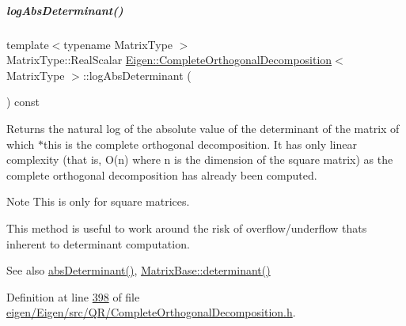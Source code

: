 \mbox{\label{group___q_r___module_ad59d6dc78dab52a0038ac372b4a72c0d}} 
\subparagraph{\texorpdfstring{log\+Abs\+Determinant()}{logAbsDeterminant()}\hspace{0.1cm}{\footnotesize\ttfamily [1/2]}}
{\footnotesize\ttfamily template$<$typename Matrix\+Type $>$ \\
Matrix\+Type\+::\+Real\+Scalar \hyperlink{group___q_r___module_class_eigen_1_1_complete_orthogonal_decomposition}{Eigen\+::\+Complete\+Orthogonal\+Decomposition}$<$ Matrix\+Type $>$\+::log\+Abs\+Determinant (\begin{DoxyParamCaption}{ }\end{DoxyParamCaption}) const}

\begin{DoxyReturn}{Returns}
the natural log of the absolute value of the determinant of the matrix of which $\ast$this is the complete orthogonal decomposition. It has only linear complexity (that is, O(n) where n is the dimension of the square matrix) as the complete orthogonal decomposition has already been computed.
\end{DoxyReturn}
\begin{DoxyNote}{Note}
This is only for square matrices.

This method is useful to work around the risk of overflow/underflow that\textquotesingle{}s inherent to determinant computation.
\end{DoxyNote}
\begin{DoxySeeAlso}{See also}
\hyperlink{group___q_r___module_ac040c34ce3fb2b68d3f57adc0c29d526}{abs\+Determinant()}, \hyperlink{group___core___module_a7ad8f77004bb956b603bb43fd2e3c061}{Matrix\+Base\+::determinant()} 
\end{DoxySeeAlso}


Definition at line \hyperlink{eigen_2_eigen_2src_2_q_r_2_complete_orthogonal_decomposition_8h_source_l00398}{398} of file \hyperlink{eigen_2_eigen_2src_2_q_r_2_complete_orthogonal_decomposition_8h_source}{eigen/\+Eigen/src/\+Q\+R/\+Complete\+Orthogonal\+Decomposition.\+h}.

